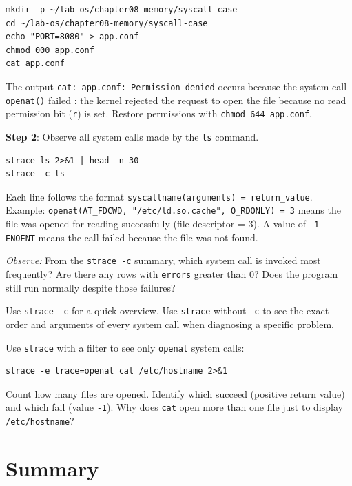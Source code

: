 \begin{lstlisting}[caption={Simulate a permission error}]
mkdir -p ~/lab-os/chapter08-memory/syscall-case
cd ~/lab-os/chapter08-memory/syscall-case
echo "PORT=8080" > app.conf
chmod 000 app.conf
cat app.conf
\end{lstlisting}

The output \texttt{cat: app.conf: Permission denied} occurs because the system call
\texttt{openat()} failed : the kernel rejected the request to open the file
because no read permission bit (\texttt{r}) is set. Restore permissions with
\texttt{chmod 644 app.conf}.

\textbf{Step 2}: Observe all system calls made by the \texttt{ls} command.

\begin{lstlisting}[caption={Detailed and summary system calls}]
strace ls 2>&1 | head -n 30
strace -c ls
\end{lstlisting}

Each line follows the format \texttt{syscallname(arguments) = return\_value}.
Example: \texttt{openat(AT\_FDCWD, "/etc/ld.so.cache", O\_RDONLY) = 3} means the
file was opened for reading successfully (file descriptor = 3). A value of
\texttt{-1 ENOENT} means the call failed because the file was not found.

\textit{Observe:} From the \texttt{strace -c} summary, which system call is invoked
most frequently? Are there any rows with \texttt{errors} greater than 0? Does the
program still run normally despite those failures?

\begin{tipbox}
Use \texttt{strace -c} for a quick overview. Use \texttt{strace} without \texttt{-c}
to see the exact order and arguments of every system call when diagnosing a specific
problem.
\end{tipbox}

\begin{challengebox}
Use \texttt{strace} with a filter to see only \texttt{openat} system calls:
\begin{lstlisting}
strace -e trace=openat cat /etc/hostname 2>&1
\end{lstlisting}
Count how many files are opened. Identify which succeed (positive return value)
and which fail (value \texttt{-1}). Why does \texttt{cat} open more than one file
just to display \texttt{/etc/hostname}?
\end{challengebox}

\section{Summary}

